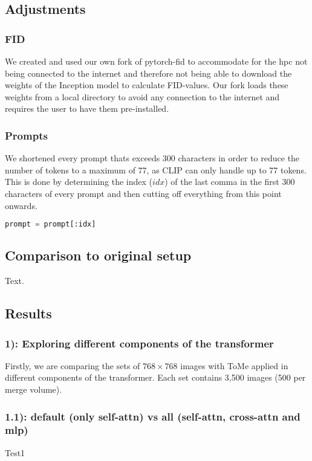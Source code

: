 \subsection{Adjustments}
\subsubsection*{FID}
We created and used our own fork of pytorch-fid\cite{Seitzer2020FID} to accommodate for the hpc not being connected to the internet and therefore not being able to download the weights of the Inception model to calculate FID-values. Our fork loads these weights from a local directory to avoid any connection to the internet and requires the user to have them pre-installed.

\subsubsection*{Prompts}
We shortened every prompt thats exceeds 300 characters in order to reduce the number of tokens to a maximum of 77, as CLIP\cite{radford2021learning} can only handle up to 77 tokens.\\
This is done by determining the index (\(idx\)) of the last comma in the first 300 characters of every prompt and then cutting off everything from this point onwards.
\begin{lstlisting}[language=Python]
prompt = prompt[:idx]
\end{lstlisting}

\subsection{Comparison to original setup}
Text.

\subsection{Results}
\subsubsection*{1): Exploring different components of the transformer}
Firstly, we are comparing the sets of $768 \times 768$ images with ToMe applied in different components of the transformer. Each set contains 3,500 images (500 per merge volume).

\newpage
\subsubsection*{1.1): default (only self-attn) vs all (self-attn, cross-attn and mlp)}
%   
%   

Test1

